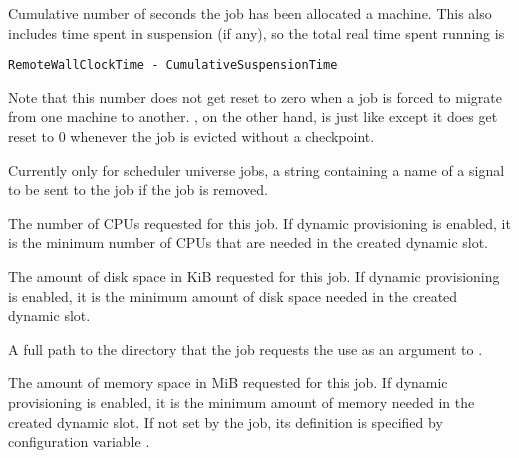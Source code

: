\begin{description}
\label{RemoteWallClockTime}
\item[\AdAttr{RemoteWallClockTime}:]  Cumulative number of seconds
the job has been allocated a machine.
This also includes time spent in suspension (if any),
so the total real time spent running is 
\begin{verbatim}
RemoteWallClockTime - CumulativeSuspensionTime
\end{verbatim}
Note that this number does not get reset to
zero when a job is forced to migrate from one machine to another.
, on the other hand, is just like
 except it does get reset to 0 whenever
the job is evicted without a checkpoint.

\item[\AdAttr{RemoveKillSig}:]    Currently only for scheduler universe jobs,
a string containing a name of
a signal to be sent to the job if the job is removed.

\item[\AdAttr{RequestCpus}:]  The number of CPUs requested for this job.
If dynamic  provisioning is enabled,
it is the minimum number of CPUs that are needed in the created dynamic slot.

\item[\AdAttr{RequestDisk}:]  The amount of disk space in KiB requested 
for this job.
If dynamic  provisioning is enabled,
it is the minimum amount of disk space needed in the created dynamic slot.

\item[\AdAttr{RequestedChroot}:]  A full path to the directory that the job
requests the  use as an argument to .

\item[\AdAttr{RequestMemory}:]  The amount of memory space in MiB 
requested for this job.
If dynamic  provisioning is enabled,
it is the minimum amount of memory needed in the created dynamic slot.
If not set by the job, its definition is specified by 
configuration variable .


\end{description}
